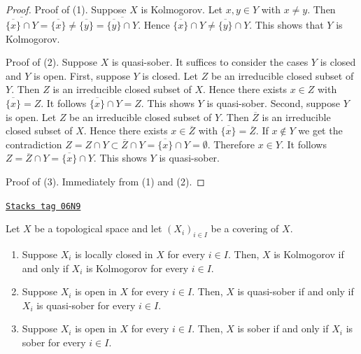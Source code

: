 \begin{proof}
Proof of (1). Suppose $X$ is Kolmogorov. Let $x,y\in Y$ with $x\neq y$. Then
$\overline{\overline{\{x\}}\cap Y}=\overline{\{x\}}\neq\overline{\{y\}}=
\overline{\overline{\{y\}}\cap Y}$. Hence
$\overline{\{x\}}\cap Y\neq\overline{\{y\}}\cap Y$. This shows that $Y$ is
Kolmogorov.

\medskip\noindent
Proof of (2). Suppose $X$ is quasi-sober. It suffices to consider the
cases $Y$ is closed and $Y$ is open. First, suppose $Y$ is closed. Let
$Z$ be an irreducible closed subset of $Y$. Then $Z$ is an irreducible closed
subset of $X$. Hence there exists $x \in Z$ with $\overline{\{x\}} = Z$. It
follows $\overline{\{x\}} \cap Y = Z$. This shows $Y$ is quasi-sober. Second,
suppose $Y$ is open. Let $Z$ be an irreducible closed subset of $Y$. Then
$\overline{Z}$ is an irreducible closed subset of $X$. Hence there
exists $x \in \overline{Z}$ with $\overline{\{x\}}=\overline{Z}$. If
$x\notin Y$ we get the contradiction
$Z=Z\cap Y\subset\overline{Z}\cap Y=\overline{\{x\}}\cap Y=\emptyset$.
Therefore $x\in Y$. It follows $Z=\overline{Z}\cap Y=\overline{\{x\}}\cap Y$.
This shows $Y$ is quasi-sober.

\medskip\noindent
Proof of (3). Immediately from (1) and (2).
\end{proof}

\begin{lemma}
\label{topology-lemma-sober-local}
\href{https://stacks.math.columbia.edu/tag/06N9}{\texttt{Stacks tag 06N9}}

Let $X$ be a topological space and let $(X_i)_{i\in I}$ be a covering of $X$.
\begin{enumerate}
\item Suppose $X_i$ is locally closed in $X$ for every $i\in I$. Then, $X$ is
Kolmogorov if and only if $X_i$ is Kolmogorov for every $i\in I$.
\item Suppose $X_i$ is open in $X$ for every $i\in I$. Then, $X$ is
quasi-sober if and only if $X_i$ is quasi-sober for every $i\in I$.
\item Suppose $X_i$ is open in $X$ for every $i\in I$. Then, $X$ is sober if
and  only if $X_i$ is sober for every $i\in I$.
\end{enumerate}
\end{lemma}

